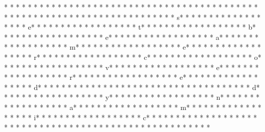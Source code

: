 {* * *  * * *  * * *  *  * * *  *  * * *  * }* * *  * * *  * * *  *  * * *  *  * * *  * 
* * *  * * *  * * *  *  * * *  *  * * *  * 
* * *  * * *  * * *  *  * * *  *  * * *  * s* * *  * * *  * * *  *  * * *  *  * * *  * e* * *  * * *  * * *  *  * * *  *  * * *  * t* * *  * * *  * * *  *  * * *  *  * * *  * b* * *  * * *  * * *  *  * * *  *  * * *  * e* * *  * * *  * * *  *  * * *  *  * * *  * a* * *  * * *  * * *  *  * * *  *  * * *  * m* * *  * * *  * * *  *  * * *  *  * * *  * e* * *  * * *  * * *  *  * * *  *  * * *  * r* * *  * * *  * * *  *  * * *  *  * * *  * c* * *  * * *  * * *  *  * * *  *  * * *  * o* * *  * * *  * * *  *  * * *  *  * * *  * v* * *  * * *  * * *  *  * * *  *  * * *  * e* * *  * * *  * * *  *  * * *  *  * * *  * r* * *  * * *  * * *  *  * * *  *  * * *  * e* * *  * * *  * * *  *  * * *  *  * * *  * d* * *  * * *  * * *  *  * * *  *  * * *  * {* * *  * * *  * * *  *  * * *  *  * * *  * d* * *  * * *  * * *  *  * * *  *  * * *  * y* * *  * * *  * * *  *  * * *  *  * * *  * n* * *  * * *  * * *  *  * * *  *  * * *  * a* * *  * * *  * * *  *  * * *  *  * * *  * m* * *  * * *  * * *  *  * * *  *  * * *  * i* * *  * * *  * * *  *  * * *  *  * * *  * c* * *  * * *  * * *  *  * * *  *  * * *  * }* * *  * * *  * * *  *  * * *  *  * * *  * 
* * *  * * *  * * *  *  * * *  *  * * *  * 
